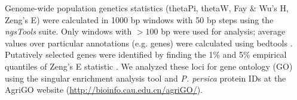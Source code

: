 \documentclass[12pt]{article}
\begin{document}
Genome-wide population genetics statistics (thetaPi, thetaW, Fay \& Wu's H, Zeng's E) were calculated in 1000 bp windows with 50 bp steps using the \emph{ngsTools} \citep{fumagalli2014ngstools} suite. 
%
Only windows with $>100$ bp were used for analysis; average values over particular annotations (e.g. genes) were calculated using bedtools \citep{quinlan2010bedtools}.
%
Putatively selected genes were identified by finding the 1\% and 5\% empirical quantiles of Zeng's E statistic \citep{zeng2006statistical}.
%
%
We analyzed these loci for gene ontology (GO) using the singular enrichment analysis tool and \emph{P. persica} protein IDs at the AgriGO website (\url{http://bioinfo.cau.edu.cn/agriGO/}).
%
%
\end{document}
